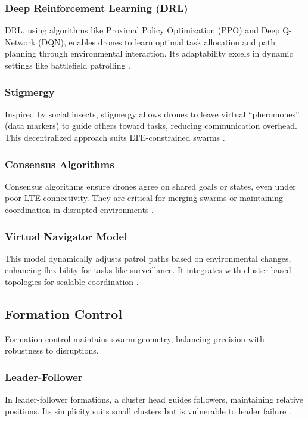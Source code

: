 \documentclass{article}
\begin{document}
\subsubsection{Deep Reinforcement Learning (DRL)}
DRL, using algorithms like Proximal Policy Optimization (PPO) and Deep Q-Network (DQN), enables drones to learn optimal task allocation and path planning through environmental interaction. Its adaptability excels in dynamic settings like battlefield patrolling \cite{Mnih2015, Schulman2017}.

\subsubsection{Stigmergy}
Inspired by social insects, stigmergy allows drones to leave virtual ``pheromones'' (data markers) to guide others toward tasks, reducing communication overhead. This decentralized approach suits LTE-constrained swarms \cite{Theraulaz1999, Beckers2000}.

\subsubsection{Consensus Algorithms}
Consensus algorithms ensure drones agree on shared goals or states, even under poor LTE connectivity. They are critical for merging swarms or maintaining coordination in disrupted environments \cite{OlfatiSaber2007, Ren2007}.

\subsubsection{Virtual Navigator Model}
This model dynamically adjusts patrol paths based on environmental changes, enhancing flexibility for tasks like surveillance. It integrates with cluster-based topologies for scalable coordination \cite{Low2019, Zhang2022}.

\subsection{Formation Control}
Formation control maintains swarm geometry, balancing precision with robustness to disruptions.

\subsubsection{Leader-Follower}
In leader-follower formations, a cluster head guides followers, maintaining relative positions. Its simplicity suits small clusters but is vulnerable to leader failure \cite{Consolini2008, Wang2019}.
\end{document}

